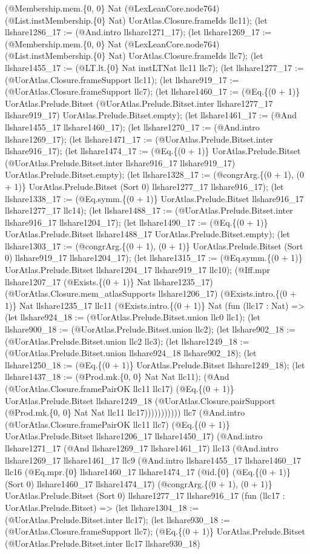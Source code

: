 \documentclass[11pt]{article}
\begin{document}
(@Membership.mem.\{0, 0\} Nat (@LexLeanCore.node764) (@List.instMembership.\{0\} Nat) UorAtlas.Closure.frameIds llc11); (let llshare1286\_17 := (@And.intro llshare1271\_17); (let llshare1269\_17 := (@Membership.mem.\{0, 0\} Nat (@LexLeanCore.node764) (@List.instMembership.\{0\} Nat) UorAtlas.Closure.frameIds llc7); (let llshare1455\_17 := (@LT.lt.\{0\} Nat instLTNat llc11 llc7); (let llshare1277\_17 := (@UorAtlas.Closure.frameSupport llc11); (let llshare919\_17 := (@UorAtlas.Closure.frameSupport llc7); (let llshare1460\_17 := (@Eq.\{(0 + 1)\} UorAtlas.Prelude.Bitset (@UorAtlas.Prelude.Bitset.inter llshare1277\_17 llshare919\_17) UorAtlas.Prelude.Bitset.empty); (let llshare1461\_17 := (@And llshare1455\_17 llshare1460\_17); (let llshare1270\_17 := (@And.intro llshare1269\_17); (let llshare1471\_17 := (@UorAtlas.Prelude.Bitset.inter llshare916\_17); (let llshare1474\_17 := (@Eq.\{(0 + 1)\} UorAtlas.Prelude.Bitset (@UorAtlas.Prelude.Bitset.inter llshare916\_17 llshare919\_17) UorAtlas.Prelude.Bitset.empty); (let llshare1328\_17 := (@congrArg.\{(0 + 1), (0 + 1)\} UorAtlas.Prelude.Bitset (Sort 0) llshare1277\_17 llshare916\_17); (let llshare1338\_17 := (@Eq.symm.\{(0 + 1)\} UorAtlas.Prelude.Bitset llshare916\_17 llshare1277\_17 llc14); (let llshare1488\_17 := (@UorAtlas.Prelude.Bitset.inter llshare916\_17 llshare1204\_17); (let llshare1490\_17 := (@Eq.\{(0 + 1)\} UorAtlas.Prelude.Bitset llshare1488\_17 UorAtlas.Prelude.Bitset.empty); (let llshare1303\_17 := (@congrArg.\{(0 + 1), (0 + 1)\} UorAtlas.Prelude.Bitset (Sort 0) llshare919\_17 llshare1204\_17); (let llshare1315\_17 := (@Eq.symm.\{(0 + 1)\} UorAtlas.Prelude.Bitset llshare1204\_17 llshare919\_17 llc10); (@Iff.mpr llshare1207\_17 (@Exists.\{(0 + 1)\} Nat llshare1235\_17) (@UorAtlas.Closure.mem\_atlasSupports llshare1206\_17) (@Exists.intro.\{(0 + 1)\} Nat llshare1235\_17 llc11 (@Exists.intro.\{(0 + 1)\} Nat (fun (llc17 : Nat) => (let llshare924\_18 := (@UorAtlas.Prelude.Bitset.union llc0 llc1); (let llshare900\_18 := (@UorAtlas.Prelude.Bitset.union llc2); (let llshare902\_18 := (@UorAtlas.Prelude.Bitset.union llc2 llc3); (let llshare1249\_18 := (@UorAtlas.Prelude.Bitset.union llshare924\_18 llshare902\_18); (let llshare1250\_18 := (@Eq.\{(0 + 1)\} UorAtlas.Prelude.Bitset llshare1249\_18); (let llshare1437\_18 := (@Prod.mk.\{0, 0\} Nat Nat llc11); (@And (@UorAtlas.Closure.framePairOK llc11 llc17) (@Eq.\{(0 + 1)\} UorAtlas.Prelude.Bitset llshare1249\_18 (@UorAtlas.Closure.pairSupport (@Prod.mk.\{0, 0\} Nat Nat llc11 llc17))))))))))) llc7 (@And.intro (@UorAtlas.Closure.framePairOK llc11 llc7) (@Eq.\{(0 + 1)\} UorAtlas.Prelude.Bitset llshare1206\_17 llshare1450\_17) (@And.intro llshare1271\_17 (@And llshare1269\_17 llshare1461\_17) llc13 (@And.intro llshare1269\_17 llshare1461\_17 llc9 (@And.intro llshare1455\_17 llshare1460\_17 llc16 (@Eq.mpr.\{0\} llshare1460\_17 llshare1474\_17 (@id.\{0\} (@Eq.\{(0 + 1)\} (Sort 0) llshare1460\_17 llshare1474\_17) (@congrArg.\{(0 + 1), (0 + 1)\} UorAtlas.Prelude.Bitset (Sort 0) llshare1277\_17 llshare916\_17 (fun (llc17 : UorAtlas.Prelude.Bitset) => (let llshare1304\_18 := (@UorAtlas.Prelude.Bitset.inter llc17); (let llshare930\_18 := (@UorAtlas.Closure.frameSupport llc7); (@Eq.\{(0 + 1)\} UorAtlas.Prelude.Bitset (@UorAtlas.Prelude.Bitset.inter llc17 llshare930\_18) 
\end{document}
